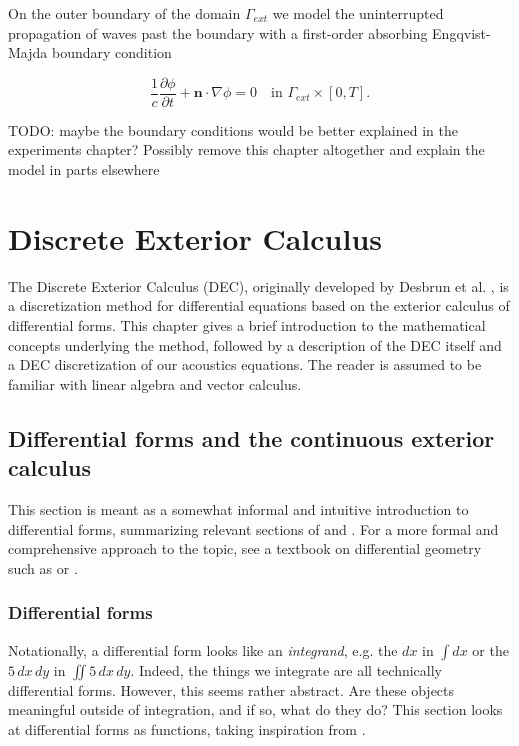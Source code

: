 \documentclass[utf8,english]{gradu3}
\begin{document}
On the outer boundary of the domain $\Gamma_{ext}$
we model the uninterrupted propagation of waves past the boundary
with a first-order absorbing Engqvist-Majda boundary condition
\parencite{engquist_absorbing_1977}

\[
  \frac{1}{c}\frac{\partial\phi}{\partial t} + \mathbf{n} \cdot \nabla\phi = 0
  \quad \text{in } \Gamma_{ext} \times [0, T].
\]


TODO: maybe the boundary conditions would be better explained
in the experiments chapter?
Possibly remove this chapter altogether
and explain the model in parts elsewhere



\chapter{Discrete Exterior Calculus}

The Discrete Exterior Calculus (DEC),
originally developed by Desbrun et al. \parencite*{desbrun_discrete_2005},
is a discretization method for differential equations
based on the exterior calculus of differential forms.
This chapter gives a brief introduction to the mathematical concepts
underlying the method, followed by a description of the DEC itself
and a DEC discretization of our acoustics equations.
The reader is assumed to be familiar with linear algebra and vector calculus.


\section{Differential forms and the continuous exterior calculus}

This section is meant as a somewhat informal and intuitive introduction
to differential forms, summarizing relevant sections of
\parencite{blair_perot_differential_2014} and \parencite{crane_digital_2013}.
For a more formal and comprehensive approach to the topic,
see a textbook on differential geometry such as \parencite{lee_introduction_2012}
or \parencite{abraham_manifolds_2012}.


\subsection{Differential forms}

Notationally, a differential form looks like an \textit{integrand},
e.g. the $dx$ in $\int dx$ or the $5\,dx\,dy$ in $\iint 5\,dx\,dy$.
Indeed, the things we integrate are all technically differential forms.
However, this seems rather abstract.
Are these objects meaningful outside of integration,
and if so, what do they do?
This section looks at differential forms as functions,
taking inspiration from \parencite{crane_digital_2013}.
\end{document}

